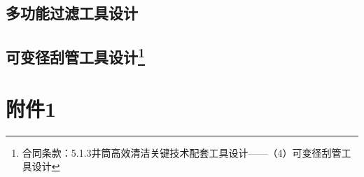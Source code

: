 \documentclass[12pt, a4paper, zihao=-4, openright]{ctexrep}
\begin{document}
\section{多功能过滤工具设计}
\section[可变径刮管工具设计]{可变径刮管工具设计\protect\footnote{合同条款：5.1.3井筒高效清洁关键技术配套工具设计——（4）可变径刮管工具设计}}
	
%



\newpage
\appendix
\setcounter{chapter}{1}
\renewcommand{\thesection}{\arabic{chapter}.\arabic{section}}

\chapter*{附件1}


\end{document}
